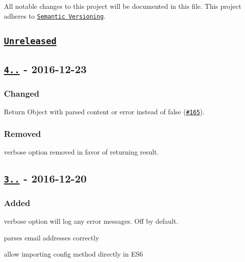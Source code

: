 All notable changes to this project will be documented in this file. This project adheres to \href{http://semver.org/}{\tt Semantic Versioning}.

\subsection*{\href{https://github.com/motdotla/dotenv/compare/v4.0.0...HEAD}{\tt Unreleased}}

\subsection*{\href{https://github.com/motdotla/dotenv/compare/v3.0.0...v4.0.0}{\tt 4..} -\/ 2016-\/12-\/23}

\subsubsection*{Changed}


\begin{DoxyItemize}
\item Return Object with parsed content or error instead of false (\href{https://github.com/motdotla/dotenv/pull/165}{\tt \#165}).
\end{DoxyItemize}

\subsubsection*{Removed}


\begin{DoxyItemize}
\item {\ttfamily verbose} option removed in favor of returning result.
\end{DoxyItemize}

\subsection*{\href{https://github.com/motdotla/dotenv/compare/v2.0.0...v3.0.0}{\tt 3..} -\/ 2016-\/12-\/20}

\subsubsection*{Added}


\begin{DoxyItemize}
\item {\ttfamily verbose} option will log any error messages. Off by default.
\item parses email addresses correctly
\item allow importing config method directly in E\+S6
\end{DoxyItemize}

